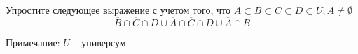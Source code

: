 \question
Упростите следующее выражение с учетом того, что $A\subset B \subset C \subset D \subset U; A \neq \emptyset$
\begin{equation*}
	\overline{B} \cap \overline{C} \cap D \cup \overline{A} \cap \overline{C} \cap D \cup \overline{A} \cap B
\end{equation*}

Примечание: $U$ -- универсум